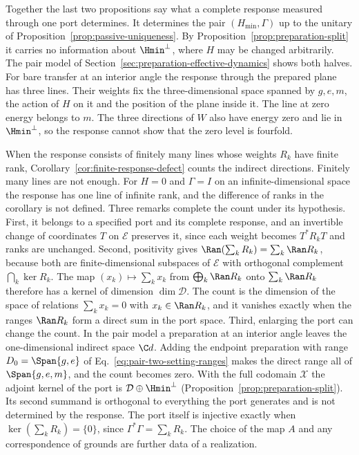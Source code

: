 Together the last two propositions say what a complete response measured through one port determines. It determines the pair $(H_{\min},\Gamma)$ up to the unitary of Proposition~\ref{prop:passive-uniqueness}. By Proposition~\ref{prop:preparation-split} it carries no information about $\Hmin^\perp$, where $H$ may be changed arbitrarily. The pair model of Section~\ref{sec:preparation-effective-dynamics} shows both halves. For bare transfer at an interior angle the response through the prepared plane has three lines. Their weights fix the three-dimensional space spanned by $g,e,m$, the action of $H$ on it and the position of the plane inside it. The line at zero energy belongs to $m$. The three directions of $W$ also have energy zero and lie in $\Hmin^\perp$, so the response cannot show that the zero level is fourfold.

When the response consists of finitely many lines whose weights $R_k$ have finite rank, Corollary~\ref{cor:finite-response-defect} counts the indirect directions. Finitely many lines are not enough. For $H=0$ and $\Gamma=I$ on an infinite-dimensional space the response has one line of infinite rank, and the difference of ranks in the corollary is not defined. Three remarks complete the count under its hypothesis. First, it belongs to a specified port and its complete response, and an invertible change of coordinates $T$ on $\mathcal E$ preserves it, since each weight becomes $T^*R_kT$ and ranks are unchanged. Second, positivity gives $\Ran(\sum_kR_k)=\sum_k\Ran R_k$, because both are finite-dimensional subspaces of $\mathcal E$ with orthogonal complement $\bigcap_k\ker R_k$. The map $(x_k)\mapsto\sum_kx_k$ from $\bigoplus_k\Ran R_k$ onto $\sum_k\Ran R_k$ therefore has a kernel of dimension $\dim\mathcal D$. The count is the dimension of the space of relations $\sum_kx_k=0$ with $x_k\in\Ran R_k$, and it vanishes exactly when the ranges $\Ran R_k$ form a direct sum in the port space. Third, enlarging the port can change the count. In the pair model a preparation at an interior angle leaves the one-dimensional indirect space $\C d$. Adding the endpoint preparation with range $D_0=\Span\{g,e\}$ of Eq.~\eqref{eq:pair-two-setting-ranges} makes the direct range all of $\Span\{g,e,m\}$, and the count becomes zero. With the full codomain $\mathcal X$ the adjoint kernel of the port is $\mathcal D\oplus\Hmin^\perp$ (Proposition~\ref{prop:preparation-split}). Its second summand is orthogonal to everything the port generates and is not determined by the response. The port itself is injective exactly when $\ker(\sum_kR_k)=\{0\}$, since $\Gamma^*\Gamma=\sum_kR_k$. The choice of the map $A$ and any correspondence of grounds are further data of a realization.

